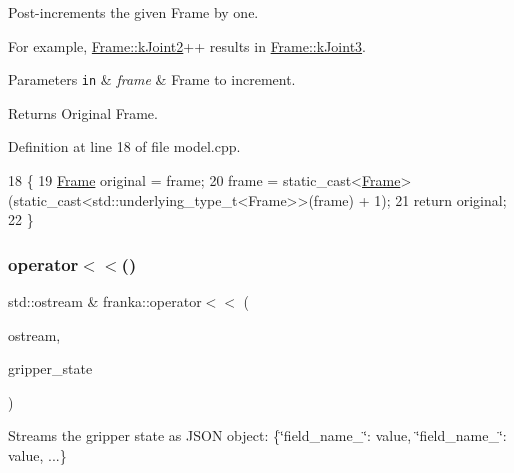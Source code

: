 Post-\/increments the given Frame by one.

For example, \hyperlink{namespacefranka_a00b729ddce916481d3f0d10febec4f5ba568ae979341feef702b710374046568a}{Frame\+::k\+Joint2}++ results in \hyperlink{namespacefranka_a00b729ddce916481d3f0d10febec4f5baa9878edbe51d6b7f7a748103fae58a9d}{Frame\+::k\+Joint3}.


\begin{DoxyParams}[1]{Parameters}
\mbox{\tt in}  & {\em frame} & Frame to increment.\\
\hline
\end{DoxyParams}
\begin{DoxyReturn}{Returns}
Original Frame. 
\end{DoxyReturn}


Definition at line 18 of file model.\+cpp.


\begin{DoxyCode}
18                                                \{
19   \hyperlink{namespacefranka_a00b729ddce916481d3f0d10febec4f5b}{Frame} original = frame;
20   frame = \textcolor{keyword}{static\_cast<}\hyperlink{namespacefranka_a00b729ddce916481d3f0d10febec4f5b}{Frame}\textcolor{keyword}{>}(\textcolor{keyword}{static\_cast<}std::underlying\_type\_t<Frame>\textcolor{keyword}{>}(frame) + 1);
21   \textcolor{keywordflow}{return} original;
22 \}
\end{DoxyCode}
\mbox{\label{namespacefranka_a1ef4ce6566d9f9bcaf49cf93f6f608af}} 
\subsubsection{\texorpdfstring{operator$<$$<$()}{operator<<()}\hspace{0.1cm}{\footnotesize\ttfamily [1/3]}}
{\footnotesize\ttfamily std\+::ostream \& franka\+::operator$<$$<$ (\begin{DoxyParamCaption}\item[{std\+::ostream \&}]{ostream,  }\item[{const \hyperlink{structfranka_1_1GripperState}{franka\+::\+Gripper\+State} \&}]{gripper\+\_\+state }\end{DoxyParamCaption})}

Streams the gripper state as J\+S\+ON object\+: \{\char`\"{}field\+\_\+name\+\_\char`\"{}\+: value, \char`\"{}field\+\_\+name\+\_\char`\"{}\+: value, ...\}


